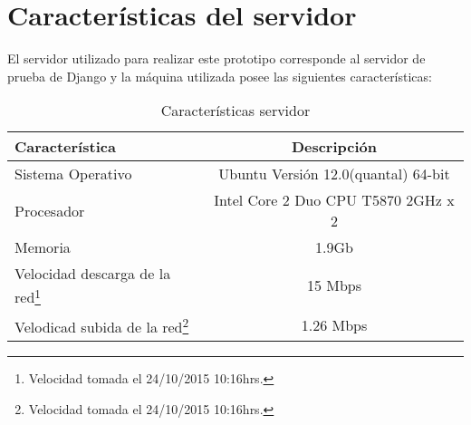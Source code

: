 \section{Características del servidor}

El servidor utilizado para realizar este prototipo corresponde al servidor de prueba
de Django y la máquina utilizada posee las siguientes características:

\begin{table}[H]
	\centering
	\begin{tabular}{| l | c |}
		\hline
		Característica   				& Descripción\\ \hline 
		Sistema Operativo    			& Ubuntu Versión 12.0(quantal) 64-bit \\ \hline
		Procesador    				& Intel Core 2 Duo CPU T5870 2GHz x 2 \\ \hline
		Memoria     	& 1.9Gb \\ \hline
		Velocidad descarga de la red\footnote{Velocidad tomada el 24/10/2015 10:16hrs.}		& 15 Mbps \\ \hline
		Velodicad subida de la red\footnote{Velocidad tomada el 24/10/2015 10:16hrs.}     	& 1.26 Mbps \\ \hline
	\end{tabular}
	\caption {Características servidor}
	\label{table:cantidad_followers_por_usuario}
\end{table}